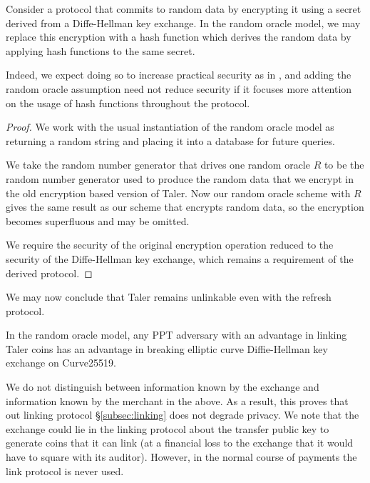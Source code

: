 \documentclass[sigconf, authordraft]{acmart}
\begin{document}
\begin{lemma}%
Consider a protocol that commits to random data by encrypting it
using a secret derived from a Diffe-Hellman key exchange.
In the random oracle model, we may replace this encryption with
a hash function which derives the random data by applying hash
functions to the same secret.
\end{lemma}

Indeed, we expect doing so to increase practical security as in
\cite{Abdalla2000}, and adding the random oracle assumption need not
reduce security if it focuses more attention on the usage of hash
functions throughout the protocol.

\begin{proof}
We work with the usual instantiation of the random oracle model as
returning a random string and placing it into a database for future
queries.

We take the random number generator that drives one random oracle $R$
to be the random number generator used to produce the random data
that we encrypt in the old encryption based version of Taler.
Now our random oracle scheme with $R$ gives the same result as our
scheme that encrypts random data, so the encryption becomes
superfluous and may be omitted.

We require the security of the original encryption operation reduced
to the security of the Diffe-Hellman key exchange, which remains a
requirement of the derived protocol.
\end{proof}

We may now conclude that Taler remains unlinkable even with the refresh protocol.

\begin{theorem}
In the random oracle model, any PPT adversary with an advantage
in linking Taler coins has an advantage in breaking elliptic curve
Diffie-Hellman key exchange on Curve25519.
\end{theorem}

We do not distinguish between information known by the exchange and
information known by the merchant in the above.  As a result, this
proves that out linking protocol \S\ref{subsec:linking} does not
degrade privacy.  We note that the exchange could lie in the linking
protocol about the transfer public key to generate coins that it can
link (at a financial loss to the exchange that it would have to square
with its auditor).  However, in the normal course of payments the link
protocol is never used.
\end{document}
